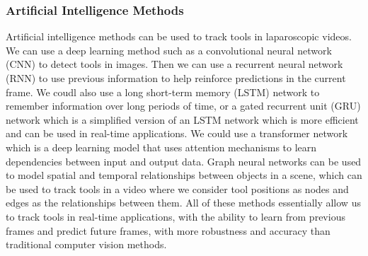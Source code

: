 \begin{multicols}{2}
\subsubsection{Artificial Intelligence Methods}

Artificial intelligence methods can be used to track tools in laparoscopic videos. We can use a deep learning method such as a convolutional neural network (CNN) to detect tools in images. Then we can use a recurrent neural network (RNN) to use previous information to help reinforce predictions in the current frame. We coudl also use a long short-term memory (LSTM) network to remember information over long periods of time, or a gated recurrent unit (GRU) network which is a simplified version of an LSTM network which is more efficient and can be used in real-time applications. We could use a transformer network which is a deep learning model that uses attention mechanisms to learn dependencies between input and output data.  Graph neural networks can be used to model spatial and temporal relationships between objects in a scene, which can be used to track tools in a video where we consider tool positions as nodes and edges as the relationships between them. All of these methods essentially allow us to track tools in real-time applications, with the ability to learn from previous frames and predict future frames, with more robustness and accuracy than traditional computer vision methods.



\end{multicols}